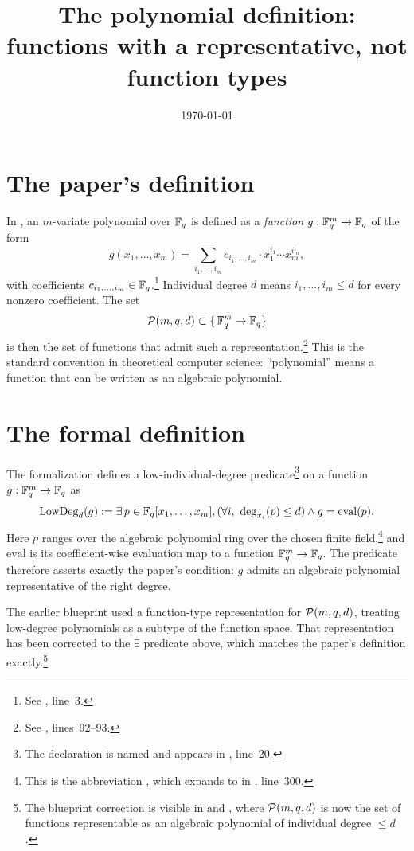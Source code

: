 \documentclass{article}
\title{The polynomial definition: functions with a representative,
not function types}
\author{}
\date{\today}
\begin{document}
\maketitle

\section{The paper's definition}

In \cite{Ji2020LowIndividualDegree}, an $m$-variate polynomial over
$\mathbb{F}_q$ is defined as a \emph{function}
$g : \mathbb{F}_q^m \to \mathbb{F}_q$ of the form
\[
  g(x_1,\dots,x_m) = \sum_{i_1,\dots,i_m}
    c_{i_1,\dots,i_m} \cdot x_1^{i_1}\cdots x_m^{i_m},
\]
with coefficients $c_{i_1,\dots,i_m} \in
\mathbb{F}_q$.\footnote{See ,
line~3.}
Individual degree $d$ means $i_1,\dots,i_m \le d$ for every nonzero
coefficient. The set
\[
  \mathcal{P}(m, q, d)
  \subset  \{\, \mathbb{F}_q^m \to \mathbb{F}_q \}
\]
is then the set of functions that admit such a
representation.\footnote{See
, lines~92--93.}
This is the standard convention in theoretical computer science:
``polynomial'' means a function that can be written as an algebraic
polynomial.

\section{The formal definition}

The formalization defines a low-individual-degree
predicate\footnote{The declaration is named
 and appears in
, line~20.} on a
function $g : \mathbb{F}_q^m \to \mathbb{F}_q$ as
\[
  \mathrm{LowDeg}_d(g) := 
  \exists\, p \in \mathbb{F}_q[x_1,\dots,x_m], 
    (\forall i,\ \deg_{x_i}(p) \le d)
    \wedge 
    g = \mathrm{eval}(p).
\]
Here $p$ ranges over the algebraic polynomial ring over the chosen
finite field,\footnote{This is the abbreviation
, which expands to
 in
, line~300.}
and $\mathrm{eval}$ is its coefficient-wise evaluation map to a
function $\mathbb{F}_q^m \to \mathbb{F}_q$. The predicate therefore asserts exactly
the paper's condition: $g$ admits an algebraic polynomial
representative of the right degree.

The earlier blueprint used a function-type representation for
$\mathcal{P}(m, q, d)$, treating low-degree polynomials as a subtype
of the function space. That representation has been corrected to
the $\exists$ predicate above, which matches the paper's definition
exactly.\footnote{The blueprint correction is visible in
 and
, where
$\mathcal{P}(m, q, d)$ is now the set of functions representable as an
algebraic polynomial of individual degree $\le d$.}
\end{document}

